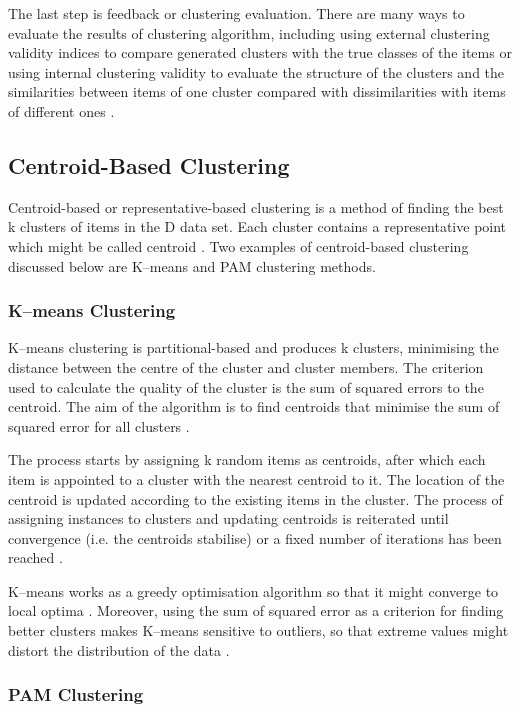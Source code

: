 The last step is feedback or clustering evaluation. There are many ways to evaluate the results of clustering algorithm, including using external clustering validity indices to compare generated clusters with the true classes of the items or using internal clustering validity to evaluate the structure of the clusters and the similarities between items of one cluster compared with dissimilarities with items of different ones \cite{Jain1999, Zaki2014}.


\subsection{Centroid-Based Clustering}

Centroid-based or representative-based clustering is a method of finding the best k clusters of items in the D data set. Each cluster contains a representative point which might be called centroid \cite{Zaki2014}. Two examples of centroid-based clustering discussed below are K--means and PAM clustering methods.

\subsubsection{K--means Clustering}

K--means clustering is partitional-based and produces k clusters, minimising the distance between the centre of the cluster and cluster members. The criterion used to calculate the quality of the cluster is the sum of squared errors to the centroid. The aim of the algorithm is to find centroids that minimise the sum of squared error for all clusters \cite{Zaki2014}. 

The process starts by assigning k random items as centroids, after which each item is appointed to a cluster with the nearest centroid to it. The location of the centroid is updated according to the existing items in the cluster. The process of assigning instances to clusters and updating centroids is reiterated until convergence (i.e. the centroids stabilise) or a fixed number of iterations has been reached \cite{Jain1999}.  

K--means works as a greedy optimisation algorithm so that it might converge to local optima \cite{Zaki2014}. Moreover, using the sum of squared error as a criterion for finding better clusters makes K--means sensitive to outliers, so that extreme values might distort the distribution of the data \cite{Jain1999}. 

\subsubsection{PAM Clustering}

